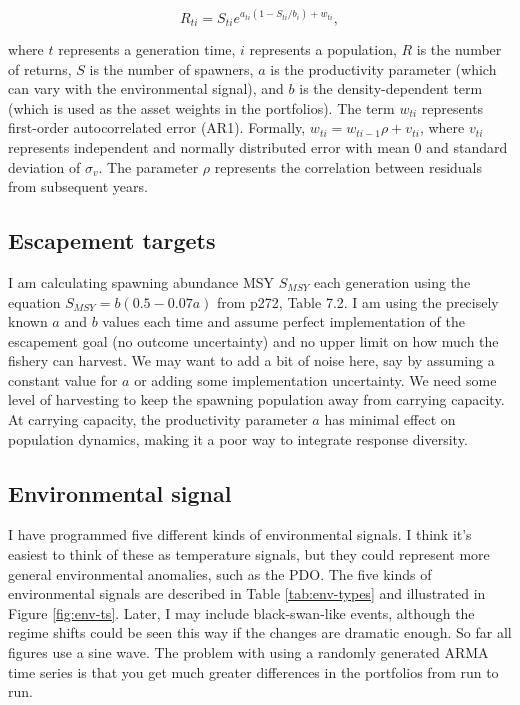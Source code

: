 \documentclass[12pt]{article}
\begin{document}
\begin{equation}
R_{ti} = S_{ti}e^{a_{ti}(1-S_{ti}/b_i) + w_{ti}},
\end{equation}

\noindent
where $t$ represents a generation time, $i$ represents a population, $R$
is the number of returns, $S$ is the number of spawners, $a$ is the
productivity parameter (which can vary with the environmental signal),
and $b$ is the density-dependent term (which is used as the asset
weights in the portfolios). The term $w_{ti}$ represents first-order
autocorrelated error (AR1). Formally, $w_{ti} = w_{ti-1} \rho + v_{ti}$,
where $v_{ti}$ represents independent and normally distributed error
with mean 0 and standard deviation of $\sigma_v$. The parameter $\rho$
represents the correlation between residuals from subsequent years.

\subsection{Escapement targets}

I am calculating spawning abundance MSY $S_{MSY}$ each generation using
the equation $S_{MSY} = b(0.5-0.07a)$ from \citet{Hilborn1992} p272,
Table 7.2. I am using the precisely known $a$ and $b$ values each time
and assume perfect implementation of the escapement goal (no outcome
uncertainty) and no upper limit on how much the fishery can harvest. We
may want to add a bit of noise here, say by assuming a constant value
for $a$ or adding some implementation uncertainty. We need some level of
harvesting to keep the spawning population away from carrying capacity.
At carrying capacity, the productivity parameter $a$ has minimal effect
on population dynamics, making it a poor way to integrate response
diversity.

\subsection{Environmental signal}

I have programmed five different kinds of environmental signals. I think
it's easiest to think of these as temperature signals, but they could
represent more general environmental anomalies, such as the PDO. The
five kinds of environmental signals are described in Table
\ref{tab:env-types} and illustrated in Figure \ref{fig:env-ts}. Later, I
may include black-swan-like events, although the regime shifts could be
seen this way if the changes are dramatic enough. So far all figures use
a sine wave. The problem with using a randomly generated ARMA time
series is that you get much greater differences in the portfolios from
run to run.
\end{document}
